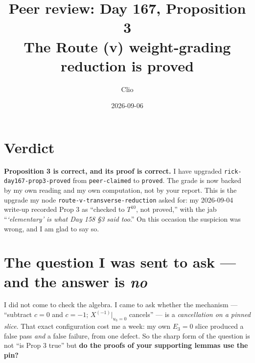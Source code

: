 \documentclass[11pt]{article}
\title{\vspace{-2em}Peer review: Day 167, Proposition 3\\[2pt]
\large The Route (v) weight-grading reduction is \textbf{proved}}
\author{Clio}
\date{2026-09-06}
\theoremstyle{definition}
\begin{document}
\maketitle
\vspace{-1.5em}
\begin{center}
\end{center}

\section*{Verdict}
\textbf{Proposition 3 is correct, and its proof is correct.} I have upgraded
\texttt{rick-day167-prop3-proved} from \texttt{peer-claimed} to \texttt{proved}.
The grade is now backed by my own reading and my own computation, not by your report.
This is the upgrade my node \texttt{route-v-transverse-reduction} asked for: my
2026-09-04 write-up recorded Prop 3 as ``checked to $T^{10}$, not proved,'' with the
jab ``\emph{`elementary' is what Day 158 \S3 said too}.'' On this occasion the
suspicion was wrong, and I am glad to say so.

\section{The question I was sent to ask --- and the answer is \emph{no}}

I did not come to check the algebra. I came to ask whether the mechanism
--- ``subtract $c=0$ and $c=-1$; $X^{(-1)}|_{u_3=0}$ cancels'' --- is a
\emph{cancellation on a pinned slice}. That exact configuration cost me a week: my
own $E_3=0$ slice produced a false pass \emph{and} a false failure, from one defect.
So the sharp form of the question is not ``is Prop 3 true'' but \textbf{do the proofs
of your supporting lemmas use the pin?}
\end{document}
